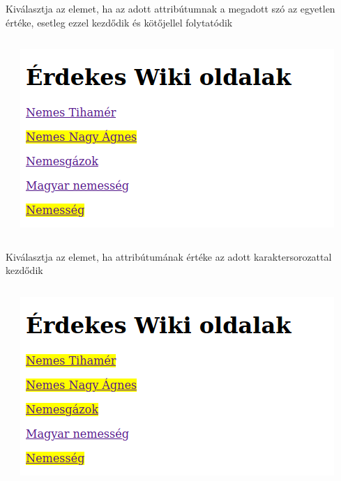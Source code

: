 \begin{frame}
  Kiválasztja az elemet, ha az adott attribútumnak a megadott szó az egyetlen értéke, esetleg ezzel kezdődik és kötőjellel folytatódik
  \begin{columns}[c]
      \begin{exampleblock}{}
      \fontsize{7}{8} \selectfont
      
      
  \end{exampleblock}
      \includegraphics[width=\textwidth]{attributum4.png}
  \end{columns}
\end{frame}

\begin{frame}
  Kiválasztja az elemet, ha attribútumának értéke az adott karaktersorozattal kezdődik
  \begin{columns}[c]
      \begin{exampleblock}{}
      \fontsize{7}{8} \selectfont
      
      
  \end{exampleblock}
      \includegraphics[width=\textwidth]{attributum5.png}
  \end{columns}
\end{frame}

